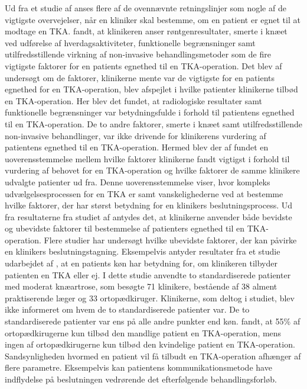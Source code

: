 Ud fra et studie af  anses flere af de ovennævnte retningslinjer som nogle af de vigtigste overvejelser, når en kliniker skal bestemme, om en patient er egnet til at modtage en TKA.  fandt, at klinikeren anser røntgenresultater, smerte i knæet ved udførelse af hverdagsaktiviteter, funktionelle begrænsninger samt utilfredsstillende virkning af non-invasive behandlingsmetoder som de fire vigtigste faktorer for en patients egnethed til en TKA-operation. Det blev af  undersøgt om de faktorer, klinikerne mente var de vigtigste for en patients egnethed for en TKA-operation, blev afspejlet i hvilke patienter klinikerne tilbød en TKA-operation. Her blev det fundet, at radiologiske resultater samt funktionelle begrænsninger var betydningsfulde i forhold til patientens egnethed til en TKA-operation. De to andre faktorer, smerte i knæet samt utilfredsstillende non-invasive behandlinger, var ikke drivende for klinikerens vurdering af patientens egnethed til en TKA-operation. Hermed blev der af  fundet en uoverensstemmelse mellem hvilke faktorer klinikerne fandt vigtigst i forhold til vurdering af behovet for en TKA-operation og hvilke faktorer de samme klinikere udvalgte patienter ud fra. Denne uoverensstemmelse viser, hvor kompleks udvælgelsesprocessen for en TKA er samt vanskelighederne ved at bestemme hvilke faktorer, der har størst betydning for en klinikers beslutningsprocess. Ud fra resultaterne fra studiet af  antydes det, at klinikerne anvender både bevidste og ubevidste faktorer til bestemmelse af patienters egnethed til en TKA-operation. Flere studier har undersøgt hvilke ubevidste faktorer, der kan påvirke en klinikers beslutningstagning. Eksempelvis antyder resultater fra et studie udarbejdet af , at en patients køn har betydning for, om klinikeren tilbyder patienten en TKA eller ej. I dette studie anvendte  to standardiserede patienter med moderat knæartrose, som besøgte 71 klinikere, bestående af 38 alment praktiserende læger og 33 ortopædkiruger. Klinikerne, som deltog i studiet, blev ikke informeret om hvem de to standardiserede patienter var. De to standardiserede patienter var ens på alle andre punkter end køn.  fandt, at 55\% af ortopædkirugerne kun tilbød den mandlige patient en TKA-operation, mens ingen af ortopædkirugerne kun tilbød den kvindelige patient en TKA-operation. Sandsynligheden hvormed en patient vil få tilbudt en TKA-operation afhænger af flere parametre. Eksempelvis kan patientens kommunikationsmetode have indflydelse på beslutningen vedrørende det efterfølgende behandlingsforløb. \citep{borkhoff2008}

